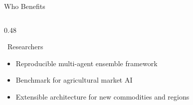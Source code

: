 \documentclass{beamer}
\begin{document}
\begin{frame}[label=benefits]{Who Benefits}
\begin{columns}[T]
\begin{column}{0.48\textwidth}
\begin{infocard}{~Researchers}
\scriptsize
\begin{itemize}\setlength\itemsep{2pt}
\item Reproducible multi-agent ensemble framework
\item Benchmark for agricultural market AI
\item Extensible architecture for new commodities and regions
\end{itemize}
\end{infocard}

\end{column}
\end{columns}

\end{frame}
\end{document}
